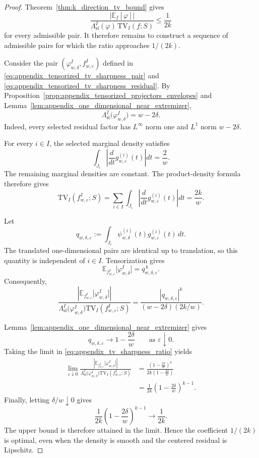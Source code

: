 \documentclass[11pt,letterpaper]{article}
\theoremstyle{definition}
\theoremstyle{remark}
\newcommand{\TV}{\mathrm{TV}}
\begin{document}
\begin{proof}
Theorem~\ref{thm:k_direction_tv_bound} gives
$$
\frac{|\mathbb E_f[\varphi]|}
{\Lambda_{\mathrm{sl}}^I(\varphi)\,\TV_I(f;S)}
\le
\frac{1}{2k}
$$
for every admissible pair. It therefore remains to construct a sequence of
admissible pairs for which the ratio approaches $1/(2k)$.

Consider the pair
$(\varphi_{w,\delta}^I,f_{w,\varepsilon}^I)$ defined in
\eqref{eq:appendix_tensorized_tv_sharpness_pair} and
\eqref{eq:appendix_tensorized_tv_sharpness_residual}.
By Proposition~\ref{prop:appendix_tensorized_projectors_envelopes} and
Lemma~\ref{lem:appendix_one_dimensional_near_extremizer},
$$
\Lambda_{\mathrm{sl}}^I
\bigl(\varphi_{w,\delta}^I\bigr)
=
w-2\delta.
$$
Indeed, every selected residual factor has $L^\infty$ norm one and
$L^1$ norm $w-2\delta$.

For every $i\in I$, the selected marginal density satisfies
$$
\int_{J_i}
\left|
\frac{d}{dt}
g_{w,\varepsilon}^{(i)}(t)
\right|dt
=
\frac{2}{w}.
$$
The remaining marginal densities are constant. The product-density formula
therefore gives
$$
\TV_I(f_{w,\varepsilon}^I;S)
=
\sum_{i\in I}
\int_{J_i}
\left|
\frac{d}{dt}
g_{w,\varepsilon}^{(i)}(t)
\right|dt
=
\frac{2k}{w}.
$$

Let
$$
q_{w,\delta,\varepsilon}
:=
\int_{J_i}
\psi_{w,\delta}^{(i)}(t)
g_{w,\varepsilon}^{(i)}(t)\,dt.
$$
The translated one-dimensional pairs are identical up to translation, so this
quantity is independent of $i\in I$. Tensorization gives
$$
\mathbb E_{f_{w,\varepsilon}^I}
\bigl[\varphi_{w,\delta}^I\bigr]
=
q_{w,\delta,\varepsilon}^{\,k}.
$$
Consequently,
\begin{equation}
\label{eq:appendix_tv_sharpness_ratio}
\frac{
\left|
\mathbb E_{f_{w,\varepsilon}^I}
\bigl[\varphi_{w,\delta}^I\bigr]
\right|
}
{
\Lambda_{\mathrm{sl}}^I
\bigl(\varphi_{w,\delta}^I\bigr)
\TV_I(f_{w,\varepsilon}^I;S)
}
=
\frac{
|q_{w,\delta,\varepsilon}|^k
}
{
(w-2\delta)(2k/w)
}.
\end{equation}

Lemma~\ref{lem:appendix_one_dimensional_near_extremizer} gives
$$
q_{w,\delta,\varepsilon}
\longrightarrow
1-\frac{2\delta}{w}
\qquad
\text{as }\varepsilon\downarrow0.
$$
Taking the limit in \eqref{eq:appendix_tv_sharpness_ratio} yields
\begin{align*}
\lim_{\varepsilon\downarrow0}
\frac{
\left|
\mathbb E_{f_{w,\varepsilon}^I}
\bigl[\varphi_{w,\delta}^I\bigr]
\right|
}
{
\Lambda_{\mathrm{sl}}^I
\bigl(\varphi_{w,\delta}^I\bigr)
\TV_I(f_{w,\varepsilon}^I;S)
}
&=
\frac{
\left(1-\frac{2\delta}{w}\right)^k
}
{
2k\left(1-\frac{2\delta}{w}\right)
}
\\
&=
\frac{1}{2k}
\left(
1-\frac{2\delta}{w}
\right)^{k-1}.
\end{align*}
Finally, letting $\delta/w\downarrow0$ gives
$$
\frac{1}{2k}
\left(
1-\frac{2\delta}{w}
\right)^{k-1}
\longrightarrow
\frac{1}{2k}.
$$
The upper bound is therefore attained in the limit. Hence the coefficient
$1/(2k)$ is optimal, even when the density is smooth and the centered residual
is Lipschitz.
\end{proof}
\end{document}
